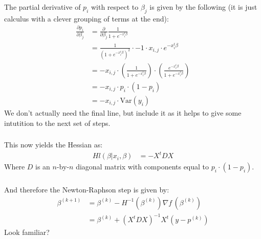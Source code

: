 \begin{frame}[fragile] \frametitle{}

The partial derivative of $p_i$ with respect to $\beta_j$ is
given by the following (it is just calculus with a clever
grouping of terms at the end):
\begin{align*}
\frac{\partial p_i}{\partial \beta_j}
&= \frac{\partial}{\partial \beta_j} \frac{1}{1+e^{-x_i^t \beta}} \\
&= \frac{1}{(1+e^{-x_i^t \beta})^2} \cdot -1 \cdot x_{i,j} \cdot e^{-x_i^t \beta} \\
&= -x_{i,j} \cdot \left(\frac{1}{1+e^{-x_i^t \beta}} \right) \cdot \left(\frac{e^{-x_i^t \beta}}{1+e^{-x_i^t \beta}} \right) \\
&= -x_{i,j} \cdot p_i \cdot (1 - p_i) \\
&= -x_{i,j} \cdot \text{Var}(y_i)
\end{align*}
\pause We don't actually need the final line, but include it as it
helps to give some intutition to the next set of steps.

\end{frame}


\begin{frame}[fragile] \frametitle{}

This now yields the Hessian as:
\begin{align*}
H l(\beta | x_i, \beta) &= - X^t D X
\end{align*}
Where $D$ is an $n$-by-$n$ diagonal matrix with components equal
to $p_i\cdot(1-p_i)$.

\end{frame}

\begin{frame}[fragile] \frametitle{}

And therefore the Newton-Raphson step is given by:
\begin{align*}
\beta^{(k+1)} &= \beta^{(k)} - H^{-1}(\beta^{(k)}) \nabla f\,(\beta^{(k)}) \\
&= \beta^{(k)} + (X^t D X)^{-1} X^t (y - p^{(k)})
\end{align*}
\pause Look familiar?

\end{frame}

